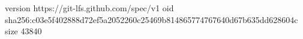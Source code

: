 version https://git-lfs.github.com/spec/v1
oid sha256:c03e5f402888d72ef5a2052260c25469b814865774767640d67b635dd628604c
size 43840
